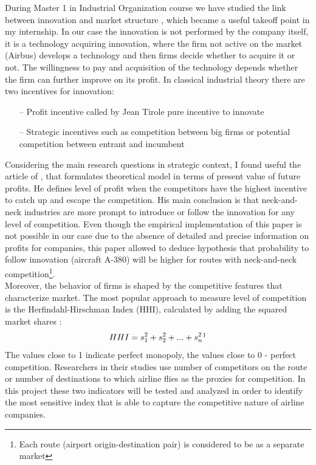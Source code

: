 \documentclass[titlepage, 11pt]{article}
\begin{document}
\tab During Master 1 in Industrial Organization course we have studied the link between innovation and market structure \cite{IO}, which became a useful takeoff point in my internship. In our case the innovation is not performed by the company itself, it is a technology acquiring innovation, where the firm not active on the market (Airbus) develops a technology and then firms decide whether to acquire it or not. The willingness to pay and acquisition of the technology depends whether the firm can further improve on its profit. In classical industrial theory there are two incentives for innovation:  
\begin{itemize}
\item[--] Profit incentive called by Jean Tirole pure incentive to innovate \cite{IO}	
\item[--] Strategic incentives such as competition between big firms or potential competition between entrant and incumbent \cite{IO}
\end{itemize} 
\tab Considering the main research questions in strategic context, I found useful the article of \citeauthor{aghion} \cite{aghion}, that formulates theoretical model in terms of present value of future profits. He defines level of profit when the competitors have the highest incentive to catch up and escape the competition. His main conclusion is that neck-and-neck industries are more prompt to introduce or follow the innovation for any level of competition. Even though the empirical implementation of this paper is not possible in our case due to the absence of detailed and precise information on profits for companies, this paper allowed to deduce hypothesis that probability to follow  innovation (aircraft A-380) will be higher for routes with neck-and-neck competition\footnote{Each route (airport origin-destination pair) is considered to be as a separate market}.\\
\tab Moreover, the behavior of firms is shaped by the competitive features that characterize market. The most popular approach to measure level of competition is the Herfindahl-Hirschman Index (HHI), calculated by adding the squared market shares \cite{Investopedia}:
\begin{equation}
HHI = s_1^2+s_2^2+...+s_n^2\footnote{Where $s_i$ is the market share of firm $i$ on the market}
\end{equation}
The values close to 1 indicate perfect monopoly, the values close to 0 - perfect competition. Researchers in their studies use number of competitors on the route or number of destinations to which airline flies as the proxies for competition. In this project these two indicators will be tested and analyzed in order to identify the most sensitive index that is able to capture the competitive nature of airline companies. \\ 
\end{document}
